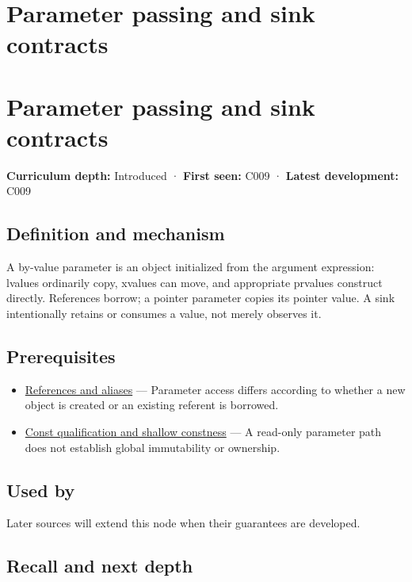 \hypertarget{appendix-d5908f75721f}{}
\section*{Parameter passing and sink contracts}
\section{Parameter passing and sink contracts}\label{parameter-passing-and-sink-contracts}

\textbf{Curriculum depth:} Introduced · \textbf{First seen:} C009 · \textbf{Latest development:} C009

\subsection{Definition and mechanism}\label{definition-and-mechanism}

A by-value parameter is an object initialized from the argument expression: lvalues ordinarily copy, xvalues can move, and appropriate prvalues construct directly. References borrow; a pointer parameter copies its pointer value. A sink intentionally retains or consumes a value, not merely observes it.

\subsection{Prerequisites}\label{prerequisites}

\begin{itemize}
\tightlist
\item
  \hyperref[appendix-d6d562ca9fbb]{References and aliases} --- Parameter access differs according to whether a new object is created or an existing referent is borrowed.
\item
  \hyperref[appendix-c25d60fed375]{Const qualification and shallow constness} --- A read-only parameter path does not establish global immutability or ownership.
\end{itemize}

\subsection{Used by}\label{used-by}

Later sources will extend this node when their guarantees are developed.

\subsection{Recall and next depth}\label{recall-and-next-depth}

